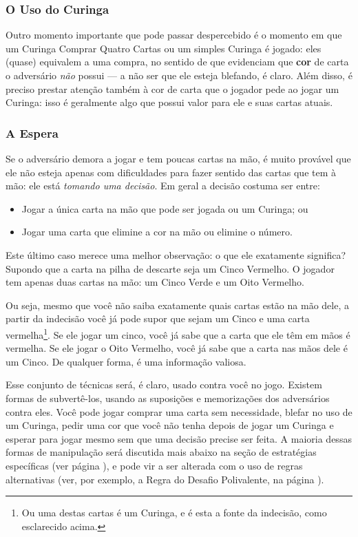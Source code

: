 \subsubsection{O Uso do Curinga}

Outro momento importante que pode passar despercebido é o momento em que um Curinga Comprar Quatro Cartas ou um simples Curinga é jogado: eles (quase) equivalem a uma compra, no sentido de que evidenciam que \textbf{cor} de carta o adversário \emph{não} possui --- a não ser que ele esteja blefando, é claro. Além disso, é preciso prestar atenção também à cor de carta que o jogador pede ao jogar um Curinga: isso é geralmente algo que possui valor para ele e suas cartas atuais.

\subsubsection{A Espera}

Se o adversário demora a jogar e tem poucas cartas na mão, é muito provável que ele não esteja apenas com dificuldades para fazer sentido das cartas que tem à mão: ele está \emph{tomando uma decisão}. Em geral a decisão costuma ser entre:

\begin{itemize}
\item{Jogar a única carta na mão que pode ser jogada ou um Curinga; ou}
\item{Jogar uma carta que elimine a cor na mão ou elimine o número.}
\end{itemize}

Este último caso merece uma melhor observação: o que ele exatamente significa? Supondo que a carta na pilha de descarte seja um Cinco Vermelho. O jogador tem apenas duas cartas na mão: um Cinco Verde e um Oito Vermelho.

Ou seja, mesmo que você não saiba exatamente quais cartas estão na mão dele, a partir da indecisão você já pode supor que sejam um Cinco e uma carta vermelha\footnote{Ou uma destas cartas é um Curinga, e é esta a fonte da indecisão, como esclarecido acima.}. Se ele jogar um cinco, você já sabe que a carta que ele têm em mãos é vermelha. Se ele jogar o Oito Vermelho, você já sabe que a carta nas mãos dele é um Cinco. De qualquer forma, é uma informação valiosa.

Esse conjunto de técnicas será, é claro, usado contra você no jogo. Existem formas de subvertê-los, usando as suposições e memorizações dos adversários contra eles. Você pode jogar comprar uma carta sem necessidade, blefar no uso de um Curinga, pedir uma cor que você não tenha depois de jogar um Curinga e esperar para jogar mesmo sem que uma decisão precise ser feita. A maioria dessas formas de manipulação será discutida mais abaixo na seção de estratégias específicas (ver página \pageref{estesp}), e pode vir a ser alterada com o uso de regras alternativas (ver, por exemplo, a Regra do Desafio Polivalente, na página \pageref{desafiopolivalente}).

